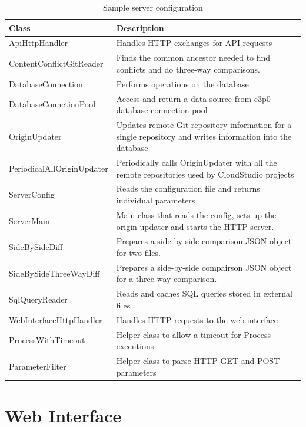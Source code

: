 \begin{table}

    \scriptsize
    \begin{tabularx}{\textwidth}{ | l | X | }
    \hline
Class & Description \\ \hline
ApiHttpHandler & Handles HTTP exchanges for API requests \\ \hline
ContentConflictGitReader & Finds the common ancestor needed to find conflicts and do three-way comparisons. \\ \hline
DatabaseConnection & Performs operations on the database \\ \hline
DatabaseConnctionPool & Access and return a data source from c3p0 database connection pool \\ \hline
OriginUpdater & Updates remote Git repository information for a single repository and writes information into the database \\ \hline
PeriodicalAllOriginUpdater & Periodically calls OriginUpdater with all the remote repositories used by CloudStudio projects \\ \hline
ServerConfig & Reads the configuration file and returns individual parameters \\ \hline
ServerMain & Main class that reads the config, sets up the origin updater and starts the HTTP server. \\ \hline
SideBySideDiff & Prepares a side-by-side comparison JSON object for two files. \\ \hline
SideBySideThreeWayDiff & Prepares a side-by-side compairson JSON object for a three-way comparison. \\ \hline
SqlQueryReader & Reads and caches SQL queries stored in external files \\ \hline
WebInterfaceHttpHandler & Handles HTTP requests to the web interface \\ \hline
ProcessWithTimeout & Helper class to allow a timeout for Process executions \\ \hline
ParameterFilter & Helper class to parse HTTP GET and POST parameters \\ \hline
    \end{tabularx}
    
    \centering
  \caption{Sample server configuration}
  \label{table:serverclasses}
\end{table}



\section{Web Interface}

